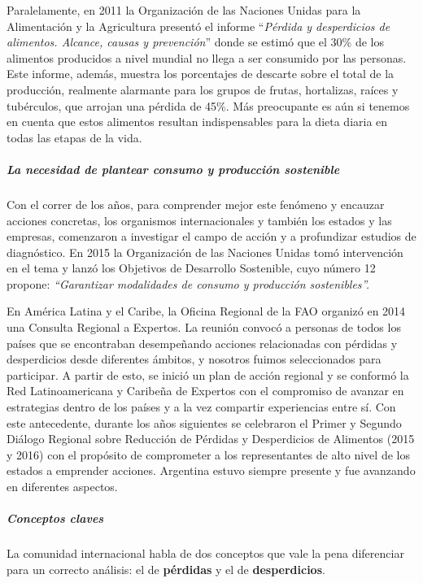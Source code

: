 \documentclass[
]{article}
\begin{document}
Paralelamente, en 2011 la Organización de las Naciones Unidas para la
Alimentación y la Agricultura presentó el informe ``\emph{Pérdida y
desperdicios de alimentos. Alcance, causas y prevención}'' donde se
estimó que el 30\% de los alimentos producidos a nivel mundial no llega
a ser consumido por las personas. Este informe, además, muestra los
porcentajes de descarte sobre el total de la producción, realmente
alarmante para los grupos de frutas, hortalizas, raíces y tubérculos,
que arrojan una pérdida de 45\%. Más preocupante es aún si tenemos en
cuenta que estos alimentos resultan indispensables para la dieta diaria
en todas las etapas de la vida.

\hypertarget{la-necesidad-de-plantear-consumo-y-producciuxf3n-sostenible}{%
\subparagraph{La necesidad de plantear consumo y producción
sostenible}\label{la-necesidad-de-plantear-consumo-y-producciuxf3n-sostenible}}

Con el correr de los años, para comprender mejor este fenómeno y
encauzar acciones concretas, los organismos internacionales y también
los estados y las empresas, comenzaron a investigar el campo de acción y
a profundizar estudios de diagnóstico. En 2015 la Organización de las
Naciones Unidas tomó intervención en el tema y lanzó los Objetivos de
Desarrollo Sostenible, cuyo número 12 propone: \emph{``Garantizar
modalidades de consumo y producción sostenibles''.}

En América Latina y el Caribe, la Oficina Regional de la FAO organizó en
2014 una Consulta Regional a Expertos. La reunión convocó a personas de
todos los países que se encontraban desempeñando acciones relacionadas
con pérdidas y desperdicios desde diferentes ámbitos, y nosotros fuimos
seleccionados para participar. A partir de esto, se inició un plan de
acción regional y se conformó la Red Latinoamericana y Caribeña de
Expertos con el compromiso de avanzar en estrategias dentro de los
países y a la vez compartir experiencias entre sí. Con este antecedente,
durante los años siguientes se celebraron el Primer y Segundo Diálogo
Regional sobre Reducción de Pérdidas y Desperdicios de Alimentos (2015 y
2016) con el propósito de comprometer a los representantes de alto nivel
de los estados a emprender acciones. Argentina estuvo siempre presente y
fue avanzando en diferentes aspectos.

\hypertarget{conceptos-claves}{%
\subparagraph{Conceptos claves}\label{conceptos-claves}}

La comunidad internacional habla de dos conceptos que vale la pena
diferenciar para un correcto análisis: el de \textbf{pérdidas} y el de
\textbf{desperdicios}.
\end{document}
